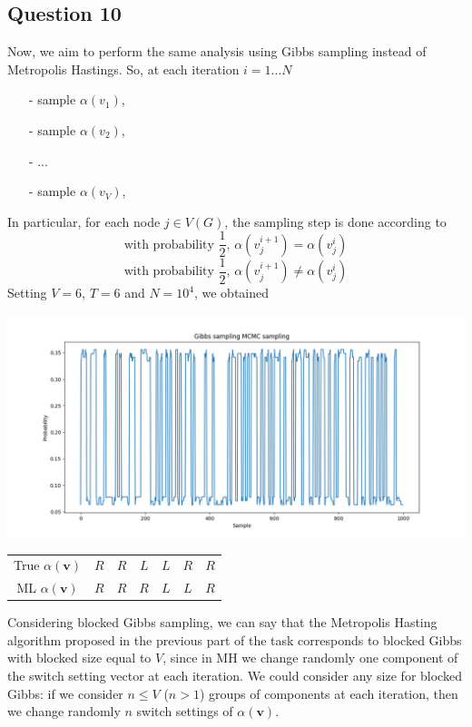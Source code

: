 \documentclass[]{article}
\begin{document}
\subsection*{Question 10}
Now, we aim to perform the same analysis using Gibbs sampling instead of Metropolis Hastings. So, at each iteration $i = 1...N$
\begin{enumerate}
	\item[-] sample $\alpha(v_1)$, 
	\item[-] sample $\alpha(v_2)$,
	\item[-] ...
	\item[-] sample $\alpha(v_V)$,  
\end{enumerate} 
In particular, for each node $j \in V(G)$, the sampling step is done according to
$$
\text{with probability } \frac{1}{2} \text{, } \alpha(v_j^{i+1}) = \alpha(v_j^i)
$$
$$
\text{with probability } \frac{1}{2} \text{, } \alpha(v_j^{i+1}) \neq \alpha(v_j^i)
$$
Setting $V=6$, $T=6$ and $N=10^4$, we obtained
\begin{center}
	\includegraphics[width=\columnwidth]{task3/V_6_T_6_N_10000_Gibbs.png}
	\begin{tabular}{| c | c | c | c | c | c | c |}
		True $\alpha(\mathbf{v})$ & $R$ & $R$ & $L$ & $L$ & $R$ & $R$ \\
		ML $\alpha(\mathbf{v})$ & $R$ & $R$ & $R$ & $L$ & $L$ & $R$ \\
	\end{tabular}
\end{center}
Considering blocked Gibbs sampling, we can say that the Metropolis Hasting algorithm proposed in the previous part of the task corresponds to blocked Gibbs with blocked size equal to $V$, since in MH we change randomly one component of the switch setting vector at each iteration. We could consider any size for blocked Gibbs: if we consider $n \leq V$ ($n > 1$) groups of components at each iteration, then we change randomly $n$ switch settings of $\alpha(\mathbf{v})$.
\end{document}

